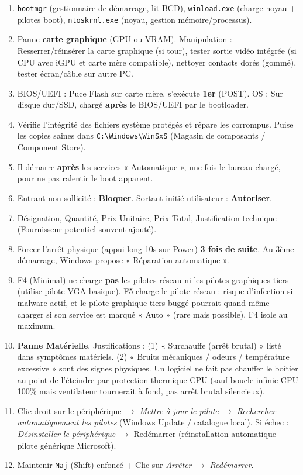 \documentclass[11pt]{article}
\begin{document}
\begin{corrige}[Exercice n]
\begin{enumerate}
    \item \texttt{bootmgr} (gestionnaire de démarrage, lit BCD), \texttt{winload.exe} (charge noyau + pilotes boot), \texttt{ntoskrnl.exe} (noyau, gestion mémoire/processus).
    \item Panne \textbf{carte graphique} (GPU ou VRAM). Manipulation : Resserrer/réinsérer la carte graphique (si tour), tester sortie vidéo intégrée (si CPU avec iGPU et carte mère compatible), nettoyer contacts dorés (gommé), tester écran/câble sur autre PC.
    \item BIOS/UEFI : Puce Flash sur carte mère, s'exécute \textbf{1er} (POST). OS : Sur disque dur/SSD, chargé \textbf{après} le BIOS/UEFI par le bootloader.
    \item Vérifie l'intégrité des fichiers système protégés et répare les corrompus. Puise les copies saines dans \texttt{C:\textbackslash Windows\textbackslash WinSxS} (Magasin de composants / Component Store).
    \item Il démarre \textbf{après} les services « Automatique », une fois le bureau chargé, pour ne pas ralentir le boot apparent.
    \item Entrant non sollicité : \textbf{Bloquer}. Sortant initié utilisateur : \textbf{Autoriser}.
    \item Désignation, Quantité, Prix Unitaire, Prix Total, Justification technique (Fournisseur potentiel souvent ajouté).
    \item Forcer l'arrêt physique (appui long 10s sur Power) \textbf{3 fois de suite}. Au 3ème démarrage, Windows propose « Réparation automatique ».
    \item F4 (Minimal) ne charge \textbf{pas} les pilotes réseau ni les pilotes graphiques tiers (utilise pilote VGA basique). F5 charge le pilote réseau : risque d'infection si malware actif, et le pilote graphique tiers buggé pourrait quand même charger si son service est marqué « Auto » (rare mais possible). F4 isole au maximum.
    \item \textbf{Panne Matérielle}. Justifications : (1) « Surchauffe (arrêt brutal) » listé dans symptômes matériels. (2) « Bruits mécaniques / odeurs / température excessive » sont des signes physiques. Un logiciel ne fait pas chauffer le boîtier au point de l'éteindre par protection thermique CPU (sauf boucle infinie CPU 100\% mais ventilateur tournerait à fond, pas arrêt brutal silencieux).
    \item Clic droit sur le périphérique $\rightarrow$ \emph{Mettre à jour le pilote} $\rightarrow$ \emph{Rechercher automatiquement les pilotes} (Windows Update / catalogue local). Si échec : \emph{Désinstaller le périphérique} $\rightarrow$ Redémarrer (réinstallation automatique pilote générique Microsoft).
    \item Maintenir \texttt{Maj} (Shift) enfoncé + Clic sur \emph{Arrêter} $\rightarrow$ \emph{Redémarrer}.
\end{enumerate}
\end{corrige}
\end{document}
